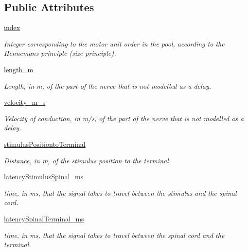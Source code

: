 \subsection*{Public Attributes}
\begin{DoxyCompactItemize}
\item 
\hyperlink{class_axon_delay_1_1_axon_delay_a5dbb9b5002d4b54bf347f48337bdb1c6}{index}
\begin{DoxyCompactList}\small\item\em Integer corresponding to the motor unit order in the pool, according to the Henneman\textquotesingle{}s principle (size principle). \end{DoxyCompactList}\item 
\hyperlink{class_axon_delay_1_1_axon_delay_a08ab7285929002db2108179ea9f5d5dd}{length\+\_\+m}
\begin{DoxyCompactList}\small\item\em Length, in m, of the part of the nerve that is not modelled as a delay. \end{DoxyCompactList}\item 
\hyperlink{class_axon_delay_1_1_axon_delay_a59cc448f95b38b88b7103c3058e8c397}{velocity\+\_\+m\+\_\+s}
\begin{DoxyCompactList}\small\item\em Velocity of conduction, in m/s, of the part of the nerve that is not modelled as a delay. \end{DoxyCompactList}\item 
\hyperlink{class_axon_delay_1_1_axon_delay_a3f6bb8f38c4474806544d01fbe9c0361}{stimulus\+Positionto\+Terminal}
\begin{DoxyCompactList}\small\item\em Distance, in m, of the stimulus position to the terminal. \end{DoxyCompactList}\item 
\hyperlink{class_axon_delay_1_1_axon_delay_a81ea09febed911b8f5e4d56a5f434f8d}{latency\+Stimulus\+Spinal\+\_\+ms}
\begin{DoxyCompactList}\small\item\em time, in ms, that the signal takes to travel between the stimulus and the spinal cord. \end{DoxyCompactList}\item 
\hyperlink{class_axon_delay_1_1_axon_delay_aaa0b8daf2629cd7fa19d539fe2168d0f}{latency\+Spinal\+Terminal\+\_\+ms}
\begin{DoxyCompactList}\small\item\em time, in ms, that the signal takes to travel between the spinal cord and the terminal. \end{DoxyCompactList}\item 

\end{DoxyCompactItemize}
